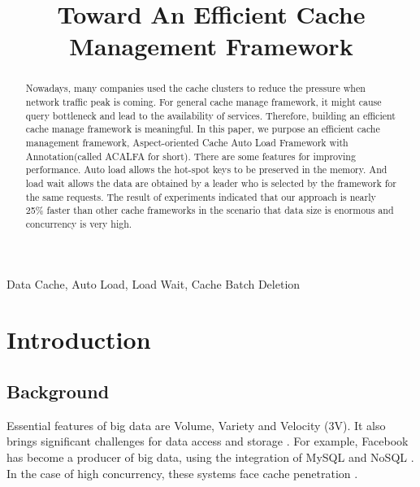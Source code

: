 \documentclass[conference]{IEEEtran}
\begin{document}
\title{Toward An Efficient Cache Management Framework}

\author{
\and
{}
}

\maketitle

\begin{abstract}
Nowadays, many companies used the cache clusters to reduce the pressure when network traffic peak is coming. For general cache manage framework, it might cause query bottleneck and lead to the availability of services. Therefore, building an efficient cache manage framework is meaningful. In this paper, we purpose an efficient cache management framework, Aspect-oriented Cache Auto Load Framework with Annotation(called ACALFA for short). There are some features for improving performance. Auto load allows the hot-spot keys to be preserved in the memory. And load wait allows the data are obtained by a leader who is selected by the framework for the same requests. The result of experiments indicated that our approach is nearly 25\% faster than other cache frameworks in the scenario that data size is enormous and concurrency is very high.
\end{abstract}

\begin{IEEEkeywords}
Data Cache, Auto Load, Load Wait, Cache Batch Deletion
\end{IEEEkeywords}

\section{Introduction}
\label{Introduction}

\subsection{Background}
Essential features of big data are Volume, Variety and Velocity (3V). It also brings significant challenges for data access and storage \cite{kaisler2013big}. For example, Facebook has become a producer of big data, using the integration of MySQL and NoSQL \cite{tang2015ripq}. In the case of high concurrency, these systems face cache penetration \cite{nishtala2013scaling}.
\end{document}

